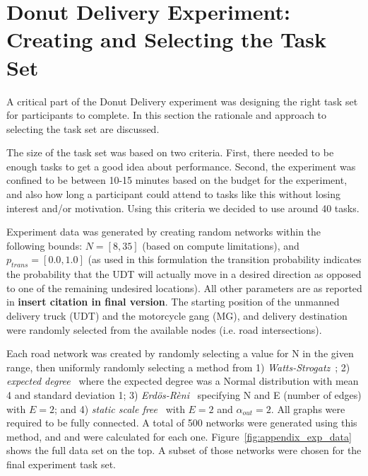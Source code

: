 \section{Donut Delivery Experiment: Creating and Selecting the Task Set} \label{sec:task_set}
A critical part of the Donut Delivery experiment was designing the right task set for participants to complete. In this section the rationale and approach to selecting the task set are discussed.

The size of the task set was based on two criteria. First, there needed to be enough tasks to get a good idea about performance. Second, the experiment was confined to be between 10-15 minutes based on the budget for the experiment, and also how long a participant could attend to tasks like this without losing interest and/or motivation. Using this criteria we decided to use around 40 tasks.

Experiment data was generated by creating random networks within the following bounds: $N = [8,35]$ (based on compute limitations), and $p_{trans}=[0.0,1.0]$ (as used in this formulation the transition probability indicates the probability that the UDT will actually move in a desired direction as opposed to one of the remaining undesired locations). All other parameters are as reported in \textbf{insert citation in final version}. The starting position of the unmanned delivery truck (UDT) and the motorcycle gang (MG), and delivery destination were randomly selected from the available nodes (i.e. road intersections).

Each road network was created by randomly selecting a value for N in the given range, then uniformly randomly selecting a method from 1) \emph{Watts-Strogatz}~\cite{Wikipedia_contributors2018-ou}; 2) \emph{expected degree}~\cite{Chung2002-jh} where the expected degree was a Normal distribution with mean 4 and standard deviation 1; 3) \emph{Erd\"{o}s-R\`{e}ni}~\cite{Wikipedia_contributors2018-ss} specifying N and E (number of edges) with $E = 2$; and 4) \emph{static scale free}~\cite{Wikipedia_contributors2019-kg} with $E = 2$ and $\alpha_{out}=2$. All graphs were required to be fully connected. A total of 500 networks were generated using this method, and \xQ{} and \xO{} were calculated for each one. Figure~\ref{fig:appendix_exp_data} shows the full data set on the top. A subset of those networks were chosen for the final experiment task set.

